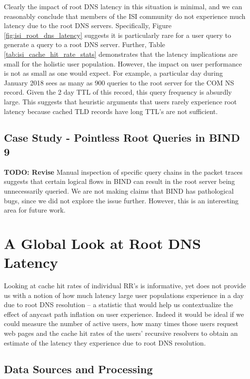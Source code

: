 \documentclass[sigconf,nonacm,10pt]{acmart}
\begin{document}
Clearly the impact of root DNS latency in this situation is minimal, and
we can reasonably conclude that members of the ISI community do not
experience much latency due to the root DNS servers. Specifically,
Figure \ref{fig:isi_root_dns_latency} suggests it is particularly rare
for a user query to generate a query to a root DNS server. Further,
Table \ref{tab:isi_cache_hit_rate_stats} demonstrates that the latency
implications are small for the holistic user population. However, the
impact on user performance is not as small as one would expect. For
example, a particular day during January 2018 sees as many as 900
queries to the root server for the COM NS record. Given the 2 day TTL of
this record, this query frequency is absurdly large. This suggests that
heuristic arguments that users rarely experience root latency because
cached TLD records have long TTL's are not sufficient. \break 

\subsection{Case Study - Pointless Root Queries in BIND
9}\label{case-study---pointless-root-queries-in-bind-9}

\label{sec:pointless_queries_case_study} \textbf{TODO: Revise} Manual
inspection of specific query chains in the packet traces suggests that
certain logical flows in BIND can result in the root server being
unnecessarily queried. We are not making claims that BIND has
pathological bugs, since we did not explore the issue further. However,
this is an interesting area for future work.

\section{A Global Look at Root DNS
Latency}\label{a-global-look-at-root-dns-latency}

\label{sec:rr_global_look} Looking at cache hit rates of individual RR's
is informative, yet does not provide us with a notion of how much
latency large user populations experience in a day due to root DNS
resolution -- a statistic that would help us contextualize the effect of
anycast path inflation on user experience. Indeed it would be ideal if
we could measure the number of active users, how many times those users
request web pages and the cache hit rates of the users' recursive
resolvers to obtain an estimate of the latency they experience due to
root DNS resolution.

\subsection{Data Sources and
Processing}\label{data-sources-and-processing-1}
\end{document}

